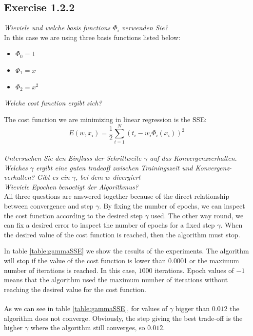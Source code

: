 \documentclass[12pt]{article}
\begin{document}
\subsection{Exercise 1.2.2}
\textit{Wieviele und welche basis functions $\Phi_i$ verwenden Sie? }\\

In this case we are using three basis functions listed below:
\begin{itemize}
\item $\Phi_0=1$
\item $\Phi_1=x$
\item $\Phi_2=x^2$
\end{itemize}
\textit{Welche cost function ergibt sich?}

The cost function we are minimizing in linear regression is the SSE:
\begin{equation}E(w, x_i) = \frac{1}{2}\sum_{i=1}^N(t_i - w_i\Phi_i(x_i))^2\end{equation} \\
\textit{Untersuchen Sie den Einfluss der Schrittweite $\gamma$ auf das Konvergenzverhalten.}\\
\textit{ Welches $\gamma$ ergibt eine guten tradeoff zwischen Trainingszeit und Konvergenz- 
verhalten? Gibt es ein  $\gamma$, bei dem $w$ divergiert}\\
\textit{Wieviele Epochen benoetigt der Algorithmus?}\\

All three questions are answered together because of the direct relationship between convergence and step $\gamma$. By fixing the number of epochs,
we can inspect the cost function according to the desired step $\gamma$ used. The other way round, we can fix a desired
error to inspect the number of epochs for a fixed step $\gamma$. When the desired value of the cost function is reached, then the algorithm must stop. 

In table \ref{table:gammaSSE} we show the results of the experiments. The algorithm will stop if the value of the cost function is lower than 0.0001 or the maximum
number of iterations is reached. In this case, $1000$ iterations. Epoch values of $-1$ means that the algorithm used the maximum number of iterations without reaching the desired value for the cost function.\\\\

As we can see in table \ref{table:gammaSSE}, for values of $\gamma$ bigger than $0.012$ the algorithm does not converge. Obviously, the step giving the best trade-off is the higher $\gamma$ where the algorithm still converges, so $0.012$.
      
\end{document}
